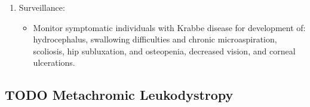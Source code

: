 \documentclass{scrartcl}
\begin{document}
\begin{enumerate}
\begin{enumerate}
\begin{enumerate}
\item Surveillance:
\label{sec:orgb3ff841}
\begin{itemize}
\item Monitor symptomatic individuals with Krabbe disease for
development of: hydrocephalus, swallowing difficulties and chronic
microaspiration, scoliosis, hip subluxation, and osteopenia,
decreased vision, and corneal ulcerations.
\end{itemize}
\end{enumerate}
\end{enumerate}
\end{enumerate}

\subsection{{\bfseries\sffamily TODO} Metachromic Leukodystropy}
\label{sec:orga231626}
\end{document}
